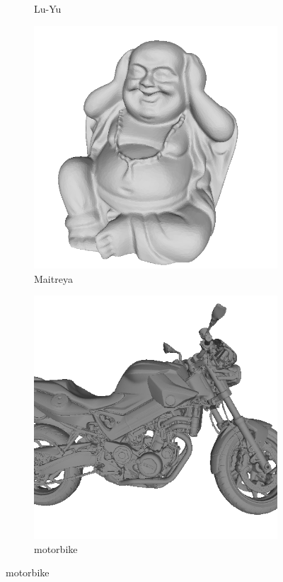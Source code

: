 \begin{figure}
\begin{subfigure}[b]{0.23\linewidth}
		\caption{Lu-Yu}
	\end{subfigure}
	\begin{subfigure}[b]{0.23\linewidth}
		\includegraphics[width=\linewidth]{./Figures/train-dataset/30.maitreya.png}
		\caption{Maitreya}
	\end{subfigure}
	\begin{subfigure}[b]{0.23\linewidth}
		\includegraphics[width=\linewidth]{./Figures/train-dataset/31.motorbike.png}
		\caption{motorbike}
	\end{subfigure}
	

\end{figure}

